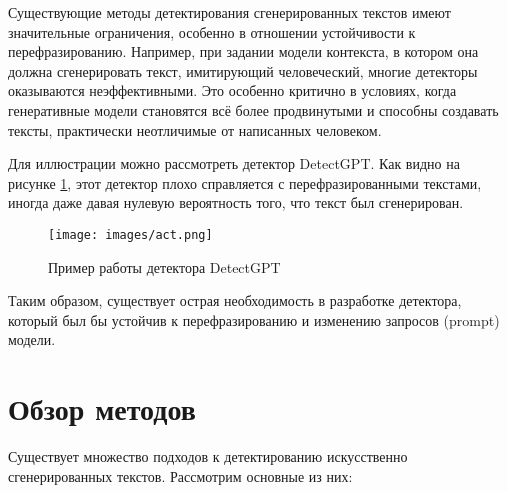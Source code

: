 \documentclass{math-mech-sci}
\begin{document}
Существующие методы детектирования сгенерированных текстов имеют значительные ограничения, особенно в отношении устойчивости к перефразированию. Например, при задании модели контекста, в котором она должна сгенерировать текст, имитирующий человеческий, многие детекторы оказываются неэффективными. Это особенно критично в условиях, когда генеративные модели становятся всё более продвинутыми и способны создавать тексты, практически неотличимые от написанных человеком.

Для иллюстрации можно рассмотреть детектор DetectGPT. Как видно на рисунке \ref{fig:detectgpt}, этот детектор плохо справляется с перефразированными текстами, иногда даже давая нулевую вероятность того, что текст был сгенерирован. 

\begin{figure}[h]
    \centering
    \texttt{[image: images/act.png]}
    \caption{Пример работы детектора DetectGPT}
    \label{fig:detectgpt}
\end{figure}

Таким образом, существует острая необходимость в разработке детектора, который был бы устойчив к перефразированию и изменению запросов (prompt) модели. 

\section{Обзор методов}

Существует множество подходов к детектированию искусственно сгенерированных текстов. Рассмотрим основные из них:
\end{document}
